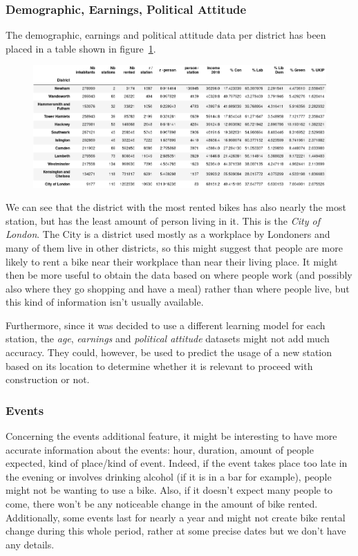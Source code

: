 \subsubsection{Demographic, Earnings, Political Attitude}
The demographic, earnings and political attitude data per district has been
placed in a table shown in figure~\ref{fig:addition_features}.
\begin{figure}[H]
\centering
\includegraphics[width=\textwidth]{img/additional_features}\label{fig:addition_features}
\label{fig:addition_features}
\end{figure}

We can see that the district with the most rented bikes has also nearly the most
station, but has the least amount of person living in it. This is the \emph{City
of London}.
The City is a district used mostly as a workplace by Londoners and many of them
live in other districts, so this might suggest that people are more likely to
rent a bike near their workplace than near their living place.
It might then be more useful to obtain the data based on where people work
(and possibly also where they go shopping and have a meal) rather than where
people live, but this kind of information isn't usually available.

Furthermore, since it was decided to use a different learning model for each station,
the \emph{age}, \emph{earnings} and \emph{political attitude} datasets might not add
much accuracy. They could, however, be used to predict the usage of a new station
based on its location to determine whether it is relevant to proceed with construction
or not.

\subsubsection{Events}

Concerning the events additional feature, it might be interesting to have more
accurate information about the events: hour, duration, amount of people expected,
kind of place/kind of event.
Indeed, if the event takes place too late in the evening or involves drinking
alcohol (if it is in a bar for example), people might not be wanting to use a bike.
Also, if it doesn't expect many people to come, there won't be any noticeable change
in the amount of bike rented.
Additionally, some events last for nearly a year and might not create bike rental
change during this whole period, rather at some precise dates but we don't have
any details.
